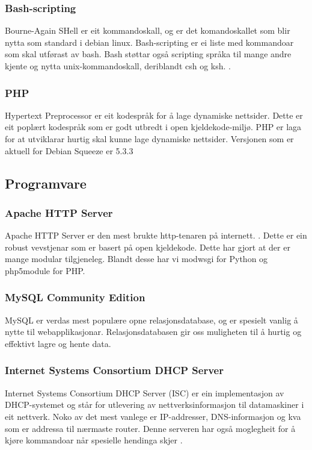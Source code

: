 \documentclass[nynorsk,12pt,a4paper,oneside]{book}
\begin{document}
\subsubsection{Bash-scripting}
Bourne-Again SHell er eit kommandoskall, og er det komandoskallet som blir nytta som standard i debian linux. \cite{debbash, bashwww} Bash-scripting er ei liste med kommandoar som skal utførast av bash. Bash støttar også scripting språka til mange andre kjente og nytta unix-kommandoskall, deriblandt csh og ksh. \cite{bashabout}.

\subsubsection{PHP}
Hypertext Preprocessor er eit kodespråk for å lage dynamiske nettsider. Dette er eit poplært kodespråk som er godt utbredt i open kjeldekode-miljø. PHP er laga for at utviklarar hurtig skal kunne lage dynamiske nettsider. \cite{phpwww} Versjonen som er aktuell for Debian Squeeze er 5.3.3 \cite{phppkg}

\subsection{Programvare}
\subsubsection{Apache HTTP Server}
Apache HTTP Server er den mest brukte http-tenaren på internett. \cite{apahcetraf}. Dette er ein robust vevstjenar som er basert på open kjeldekode. Dette har gjort at der er mange modular tilgjeneleg. Blandt desse har vi mod\textunderscore wsgi for Python og php5\textunderscore module for PHP. \cite{modwsgi, phpmodule}

\subsubsection{MySQL Community Edition}
MySQL er verdas mest populære opne relasjonsdatabase, og er spesielt vanlig å nytte til webapplikasjonar. Relasjonsdatabasen gir oss muligheten til å hurtig og effektivt lagre og hente data. \cite{mysqlwww} 

\subsubsection{Internet Systems Consortium DHCP Server}
Internet Systems Consortium DHCP Server (ISC) er ein implementasjon av DHCP-systemet og står for utlevering av nettverksinformasjon til datamaskiner i eit nettverk. Noko av det mest vanlege er IP-addresser, DNS-informasjon og kva som er addressa til nærmaste router. Denne serveren har også moglegheit for å kjøre kommandoar når spesielle hendinga skjer \cite{dhcpconf, dhcpman}. 
\end{document}
